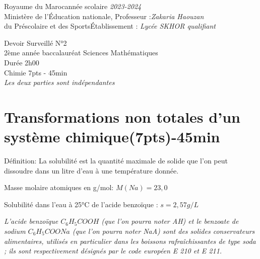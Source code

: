 \documentclass[12pt]{article}
\newcommand\headerMe[2]{\noindent{}#1\hfill#2}
\begin{document}
\headerMe{Royaume du Maroc}{année scolaire \emph{2023-2024}}\\
\headerMe{Ministère de l'Éducation nationale, }{  Professeur :\emph{Zakaria Haouzan}}\\
\headerMe{du Préscolaire et des Sports}{Établissement : \emph{Lycée SKHOR qualifiant}}\\
\begin{center}
Devoir Surveillé  N°2 \\
    2ème année baccalauréat Sciences Mathématiques\\
Durée 2h00
\\
    \vspace{.2cm}
\hrulefill
\Large{Chimie 7pts - 45min}
\hrulefill\\

    \emph{Les deux parties sont indépendantes}
\end{center}

 \section*{Transformations non totales d'un système chimique\dotfill(7pts)-45min }


Définition: La solubilité est la quantité maximale de solide que l'on peut dissoudre dans un
litre d'eau à une température donnée.

Masse molaire atomiques en g/mol: $M(Na) = 23,0$

Solubilité dans l'eau à 25°C de l’acide benzoïque : $s = 2,57 g/L$

\textit{L’acide benzoïque $C_6H_5COOH$ (que l’on pourra noter AH) et le benzoate de sodium
$C_6H_5COONa$ (que l’on pourra noter NaA) sont des solides conservateurs alimentaires, utilisés en
particulier dans les boissons rafraîchissantes de type soda ; ils sont respectivement désignés par le code
européen E 210 et E 211. }
\end{document}
